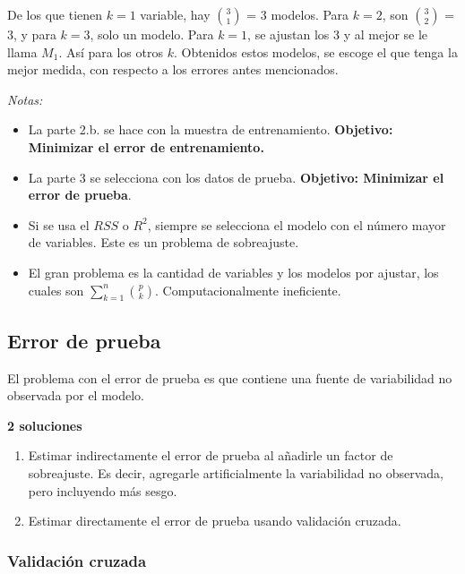 \documentclass[
  12pt,
]{book}
\providecommand{\tightlist}{%
  \setlength{\itemsep}{0pt}\setlength{\parskip}{0pt}}
\theoremstyle{definition}
\theoremstyle{definition}
\theoremstyle{definition}
\theoremstyle{remark}
\begin{document}
De los que tienen \(k=1\) variable, hay \(\binom{3}{1}\) = 3 modelos. Para \(k=2\), son \(\binom{3}{2}\) = 3, y para \(k=3\), solo un modelo. Para \(k=1\), se ajustan los 3 y al mejor se le llama \(M_1\). Así para los otros \(k\). Obtenidos estos modelos, se escoge el que tenga la mejor medida, con respecto a los errores antes mencionados.

\emph{Notas:}

\begin{itemize}
\tightlist
\item
  La parte 2.b. se hace con la muestra de entrenamiento. \textbf{Objetivo: Minimizar el error de entrenamiento.}
\item
  La parte 3 se selecciona con los datos de prueba. \textbf{Objetivo: Minimizar el error de prueba}.
\item
  Si se usa el \(RSS\) o \(R^2\), siempre se selecciona el modelo con el número mayor de variables. Este es un problema de sobreajuste.
\item
  El gran problema es la cantidad de variables y los modelos por ajustar, los cuales son \(\sum_{k=1}^n \binom{p}{k}\). Computacionalmente ineficiente.
\end{itemize}

\hypertarget{error-de-prueba}{%
\subsection{Error de prueba}\label{error-de-prueba}}

El problema con el error de prueba es que contiene una fuente de variabilidad no observada por el modelo.

\textbf{2 soluciones}

\begin{enumerate}
\def\labelenumi{\alph{enumi}.}
\tightlist
\item
  Estimar indirectamente el error de prueba al añadirle un factor de sobreajuste. Es decir, agregarle artificialmente la variabilidad no observada, pero incluyendo más sesgo.
\item
  Estimar directamente el error de prueba usando validación cruzada.
\end{enumerate}

\hypertarget{validaciuxf3n-cruzada-2}{%
\subsubsection{Validación cruzada}\label{validaciuxf3n-cruzada-2}}
\end{document}
